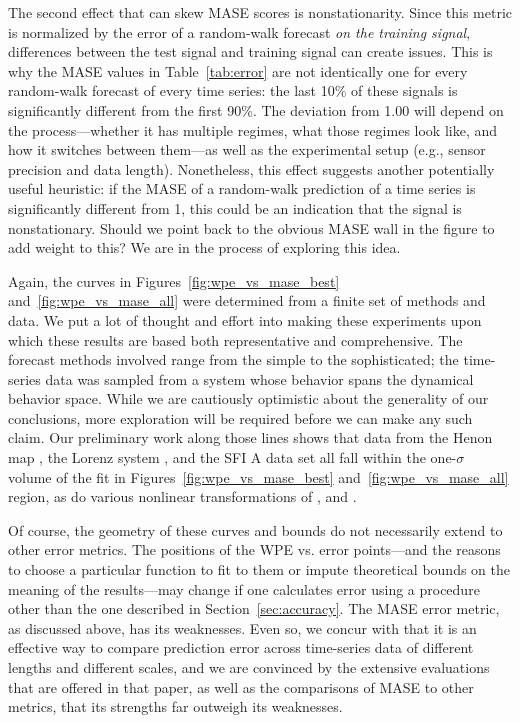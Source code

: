 
The second effect that can skew MASE scores is nonstationarity.  Since
this metric is normalized by the error of a random-walk forecast
\emph{on the training signal}, differences between the test signal and
training signal can create issues.  This is why the MASE values in
Table~\ref{tab:error} are not identically one for every random-walk
forecast of every time series: the last 10\% of these signals is
significantly different from the first 90\%.  The deviation from 1.00
will depend on the process---whether it has multiple regimes, what
those regimes look like, and how it switches between them---as well as
the experimental setup (e.g., sensor precision and data length).
Nonetheless, this effect suggests another potentially useful
heuristic: if the MASE of a random-walk prediction of a time series is
significantly different from 1, this could be an indication that the
signal is nonstationary.  \alert{Should we point back to the obvious
  MASE wall in the figure to add weight to this?}  We are in the
process of exploring this idea.

Again, the curves in Figures~\ref{fig:wpe_vs_mase_best}
and~\ref{fig:wpe_vs_mase_all} were determined from a finite set of
methods and data.  We put a lot of thought and effort into making
these experiments upon which these results are based both
representative and comprehensive.  The forecast methods involved range
from the simple to the sophisticated; the time-series data was sampled
from a system whose behavior spans the dynamical behavior space.
While we are cautiously optimistic about the generality of our
conclusions, more exploration will be required before we can make any
such claim.  Our preliminary work along those lines shows that data
from the Henon map \cite{henon}, the Lorenz system \cite{lorenz}, and
the SFI A data set \cite{sfi-data} all fall within the one-$\sigma$
volume of the fit in Figures~\ref{fig:wpe_vs_mase_best}
and~\ref{fig:wpe_vs_mase_all} region, as do various nonlinear
transformations of \svdtwo, \svdfive and \svdsix.

Of course, the geometry of these curves and bounds do not necessarily
extend to other error metrics.  The positions of the WPE vs. error
points---and the reasons to choose a particular function to fit to
them or impute theoretical bounds on the meaning of the results---may
change if one calculates error using a procedure other than the one
described in Section~\ref{sec:accuracy}.  The MASE error metric, as
discussed above, has its weaknesses.  Even so, we concur with
\cite{MASE} that it is an effective way to compare prediction error
across time-series data of different lengths and different scales, and
we are convinced by the extensive evaluations that are offered in that
paper, as well as the comparisons of MASE to other metrics, that its
strengths far outweigh its weaknesses.

